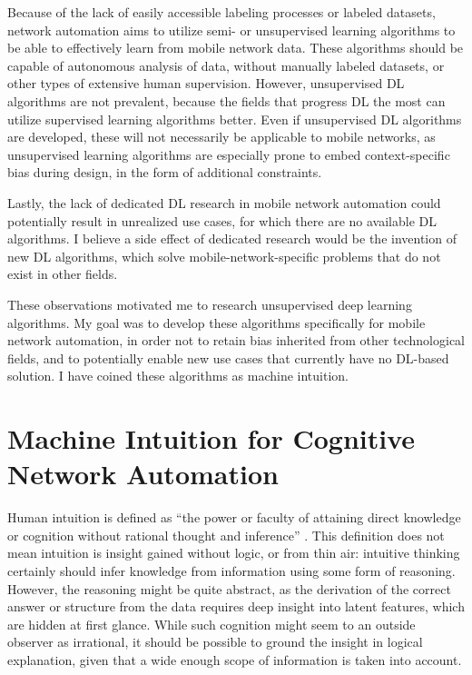 			Because of the lack of easily accessible labeling processes or labeled datasets, network automation aims to utilize semi- or unsupervised learning algorithms to be able to effectively learn from mobile network data.	
			These algorithms should be capable of autonomous analysis of data, without manually labeled datasets, or other types of extensive human supervision.
			However, unsupervised \ac{DL} algorithms are not prevalent, because the fields that progress \ac{DL} the most can utilize supervised learning algorithms better.
			Even if unsupervised \ac{DL} algorithms are developed, these will not necessarily be applicable to mobile networks, as unsupervised learning algorithms are especially prone to embed context-specific bias during design, in the form of additional constraints.
			
			Lastly, the lack of dedicated \ac{DL} research in mobile network automation could potentially result in unrealized use cases, for which there are no available \ac{DL} algorithms.
			I believe a side effect of dedicated research would be the invention of new \ac{DL} algorithms, which solve mobile-network-specific problems that do not exist in other fields.
			
			These observations motivated me to research unsupervised deep learning algorithms.
			My goal was to develop these algorithms specifically for mobile network automation, in order not to retain bias inherited from other technological fields, and to potentially enable new use cases that currently have no \ac{DL}-based solution.
			I have coined these algorithms as machine intuition.
		
	\section{Machine Intuition for Cognitive Network Automation}
	
		Human intuition is defined as ``the power or faculty of attaining direct knowledge or cognition without  rational thought and inference'' \cite{mw_intuition}.
		This definition does not mean intuition is insight gained without logic, or from thin air: intuitive thinking certainly should infer knowledge from information using some form of reasoning.
		However, the reasoning might be quite abstract, as the derivation of the correct answer or structure from the data requires deep insight into latent features, which are hidden at first glance.
		While such cognition might seem to an outside observer as irrational, it should be possible to ground the insight in logical explanation, given that a wide enough scope of information is taken into account.
		
